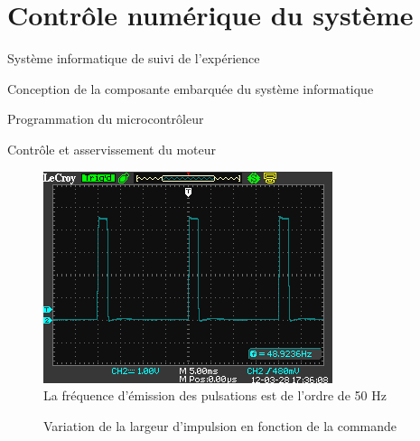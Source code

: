 \documentclass[a4paper,twoside,12pt]{article}
\newcounter{partie}
\newcounter{sous-partie}
\newenvironment{partie}[1]
{
\section{#1}
}
{

}
\newenvironment{sous-partie}[1]
{
\subsection{#1}
}
{

}
\newenvironment{sous-sous-partie}[1]
{
\subsubsection{#1}
}
{

}
\begin{document}
\begin{partie}{Contrôle numérique du système}
\begin{sous-partie}{Système informatique de suivi de l'expérience}
\begin{sous-sous-partie}{Conception de la composante embarquée du système informatique}
\begin{paragraph}{Programmation du microcontrôleur\vspace{0.3cm}\\}
\begin{subparagraph}{Contrôle et asservissement du moteur}
\begin{figure}[!h]
	\centering
	\includegraphics[width=\largeurphotooscillo]{./images/signal_pcm_global.png}
	\caption{La fréquence d'émission des pulsations est de l'ordre de 50 Hz}
	\label{signal_pcm_global}
\end{figure}

\begin{figure}[!h]
	\centering
	\captionsetup[subfigure]{labelformat=empty}
	\hspace{0,5cm}
	\caption{Variation de la largeur d'impulsion en fonction de la commande}
	\label{signal_pwm_detail}
\end{figure}


\end{subparagraph}
\end{paragraph}
\end{sous-sous-partie}
\end{sous-partie}
\end{partie}
\end{document}
